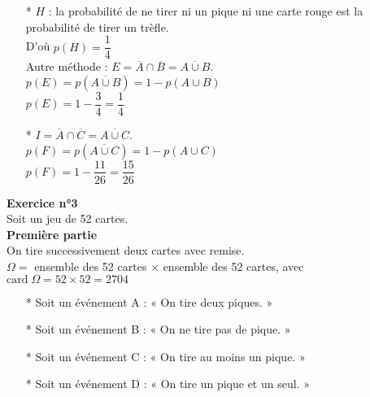\begin{itemize}
\item[*] $H$ : la probabilité de ne tirer ni un pique ni une carte rouge est la probabilité de tirer un trèfle. \\ D'où $p\left(H\right) = \dfrac{1}{4} $ \\

Autre méthode : $E = \overline{A} \cap \overline{B} = \overline{A \cup B}$. \\

$p\left(E\right) = p\left(\overline{A\cup B}\right) = 1 - p\left(A \cup B\right) $ \\

$p\left(E\right) = 1 - \dfrac{3}{4} = \dfrac{1}{4} $  \\

\item[*] $I = \overline{A} \cap \overline{C} = \overline{A \cup C}$. \\

$p\left(F\right) = p\left(\overline{A\cup C}\right) = 1 - p\left(A \cup C\right) $ \\

$p\left(F\right) = 1 - \dfrac{11}{26} = \dfrac{15}{26} $ 

\vspace*{-5cm}

\end{itemize}

\newpage

\textbf{Exercice n°3} \\

Soit un jeu de 52 cartes. \\

\textbf{Première partie} \\

On tire successivement deux cartes avec remise. \\

$\Omega =$  ensemble des 52 cartes $ \times $ ensemble des 52 cartes, avec $\mathrm{card} \; \Omega = 52 \times 52 = 2704 $ \\

\begin{itemize}
\item[*] Soit un événement A : « On tire deux piques. » 
\item[*] Soit un événement B : « On ne tire pas de pique. » 
\item[*] Soit un événement C : « On tire au moins un pique. » 
\item[*] Soit un événement D : « On tire un pique et un seul. » 
\end{itemize}

